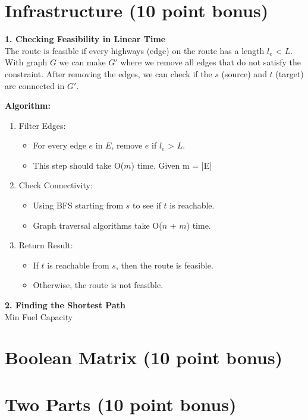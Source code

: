 \documentclass{article}[12pt]
\begin{document}
\newpage
\section{Infrastructure (10 point bonus)}
\begin{algorithm}[H]
  \textbf{1. Checking Feasibility in Linear Time}\\
  The route is feasible if every highways (edge) on the route has a length $l_e$ < $L$. 
  With graph $G$ we can make $G'$ where we remove all edges that do not satisfy the constraint.
  After removing the edges, we can check if the $s$ (source) and $t$ (target) are connected in $G'$.

  \textbf{Algorithm:}
  \begin{enumerate}
    \item Filter Edges:
      \begin{itemize}
        \item For every edge $e$ in $E$, remove $e$ if $l_e$ > $L$.
        \item This step should take O($m$) time. Given m = |E|
      \end{itemize}
    \item Check Connectivity:
      \begin{itemize}
        \item Using BFS starting from $s$ to see if $t$ is reachable.
        \item Graph traversal algorithms take O($n$ + $m$) time.
      \end{itemize}
    \item Return Result:
      \begin{itemize}
        \item If $t$ is reachable from $s$, then the route is feasible.
        \item Otherwise, the route is not feasible.
      \end{itemize}
  \end{enumerate}

  \textbf{2. Finding the Shortest Path}\\


\caption{Min Fuel Capacity}

\end{algorithm}

\newpage
\section{Boolean Matrix (10 point bonus)}

\newpage
\section{Two Parts (10 point bonus)}
\end{document}
